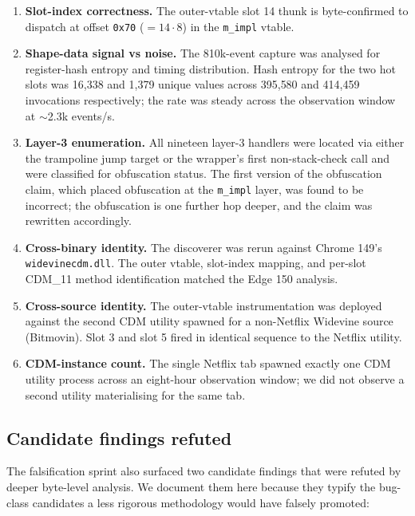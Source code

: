 \documentclass[11pt,letterpaper]{article}
\begin{document}
\begin{enumerate}[itemsep=2pt,topsep=2pt]
  \item \textbf{Slot-index correctness.} The outer-vtable slot 14
        thunk is byte-confirmed to dispatch at offset \texttt{0x70}
        ($= 14 \cdot 8$) in the \texttt{m\_impl} vtable.
  \item \textbf{Shape-data signal vs noise.} The 810k-event capture
        was analysed for register-hash entropy and timing
        distribution. Hash entropy for the two hot slots was 16{,}338
        and 1{,}379 unique values across 395{,}580 and 414{,}459
        invocations respectively; the rate was steady across the
        observation window at $\sim$2.3k events/s.
  \item \textbf{Layer-3 enumeration.} All nineteen layer-3 handlers
        were located via either the trampoline jump target or the
        wrapper's first non-stack-check call and were classified for
        obfuscation status. The first version of the obfuscation
        claim, which placed obfuscation at the \texttt{m\_impl}
        layer, was found to be incorrect; the obfuscation is one
        further hop deeper, and the claim was rewritten accordingly.
  \item \textbf{Cross-binary identity.} The discoverer was rerun
        against Chrome 149's \texttt{widevinecdm.dll}. The outer
        vtable, slot-index mapping, and per-slot CDM\_11 method
        identification matched the Edge 150 analysis.
  \item \textbf{Cross-source identity.} The outer-vtable
        instrumentation was deployed against the second CDM utility
        spawned for a non-Netflix Widevine source (Bitmovin). Slot 3
        and slot 5 fired in identical sequence to the Netflix
        utility.
  \item \textbf{CDM-instance count.} The single Netflix tab spawned
        exactly one CDM utility process across an eight-hour
        observation window; we did not observe a second utility
        materialising for the same tab.
\end{enumerate}

\subsection{Candidate findings refuted}
\label{sec:robustness-refuted}

The falsification sprint also surfaced two candidate findings that
were refuted by deeper byte-level analysis. We document them here
because they typify the bug-class candidates a less rigorous
methodology would have falsely promoted:
\end{document}
